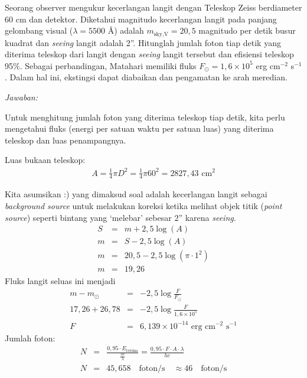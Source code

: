 \documentclass[11pt,fleqn]{exam}
\newcommand*{\as}{''}
\begin{document}
\begin{questions}
\vspace{0.5cm}
\question Seorang observer mengukur kecerlangan langit dengan Teleskop Zeiss berdiameter 60 cm dan detektor. Diketahui magnitudo kecerlangan langit pada panjang gelombang visual ($\lambda = 5500$ \AA) adalah $m_{\text{sky,V}} = 20,5$ magnitudo per detik busur kuadrat dan \textit{seeing} langit adalah 2\as. Hitunglah jumlah foton tiap detik yang diterima teleskop dari langit dengan \textit{seeing} langit tersebut dan efisiensi teleskop 95\%. Sebagai perbandingan, Matahari memiliki fluks $F_{\odot}=1,6 \times 10^5$ erg cm$^{-2}$ s$^{-1}$. Dalam hal ini, ekstingsi dapat diabaikan dan pengamatan ke arah meredian.


\textit{Jawaban: }

Untuk menghitung jumlah foton yang diterima teleskop tiap detik, kita perlu mengetahui fluks (energi per satuan waktu per satuan luas) yang diterima teleskop dan luas penampangnya.

Luas bukaan teleskop:
\begin{eqnarray*}
	A = \frac{1}{4} \pi D^2 = \frac{1}{4} \pi 60^2 = 2827,43 \text{  cm}^2 
\end{eqnarray*}

Kita asumsikan :) yang dimaksud soal adalah kecerlangan langit sebagai \textit{background source} untuk melakukan koreksi ketika melihat objek titik (\textit{point source}) seperti bintang yang `melebar' sebesar 2\as{} karena \textit{seeing}.
\begin{eqnarray*}
	S &=& m + 2,5\log{(A)}\\
	m &=& S - 2,5 \log{(A)}\\
	m &=& 20,5 - 2,5 \log{(\pi \cdot 1^2)}\\
	m &=& 19,26
\end{eqnarray*}
Fluks langit seluas ini menjadi
\begin{eqnarray*}
m - m_{\odot} &=& -2,5 \log{\frac{F}{F_{\odot}}}\\
17,26 + 26,78 &=& -2,5 \log{\frac{F}{1,6 \times 10^5}}\\
F &=& 6,139 \times 10^{-14} \text{   erg cm}^{-2}\text{ s}^{-1}
\end{eqnarray*}
Jumlah foton:
\begin{eqnarray*}
	N &=& \frac{0,95 \cdot E_\text{terima}}{\frac{hc}{\lambda}} =  \frac{0,95 \cdot F \cdot A \cdot \lambda}{hc}\\
	N &=& 45,658 \quad \text{foton/s} \quad \approx 46 \quad \text{foton/s}
\end{eqnarray*}



\end{questions}
\end{document}

